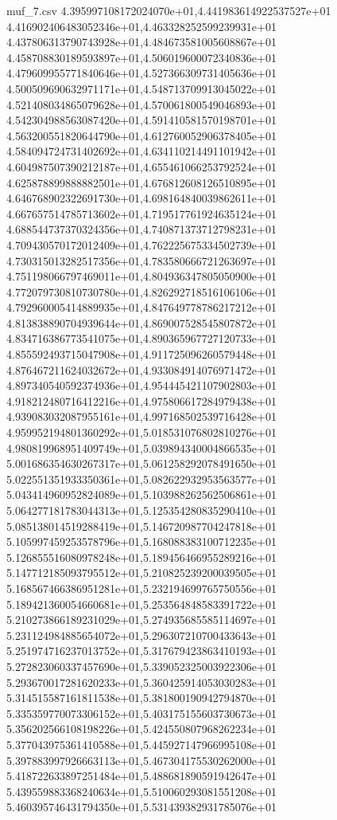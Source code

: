 \begin{filecontents*}{muf_7.csv}
4.395997108172024070e+01,4.441983614922537527e+01
4.416902406483052346e+01,4.463328252599239931e+01
4.437806313790743928e+01,4.484673581005608867e+01
4.458708830189593897e+01,4.506019600072340836e+01
4.479609955771840646e+01,4.527366309731405636e+01
4.500509690632971171e+01,4.548713709913045022e+01
4.521408034865079628e+01,4.570061800549046893e+01
4.542304988563087420e+01,4.591410581570198701e+01
4.563200551820644790e+01,4.612760052906378405e+01
4.584094724731402692e+01,4.634110214491101942e+01
4.604987507390212187e+01,4.655461066253792524e+01
4.625878899888882501e+01,4.676812608126510895e+01
4.646768902322691730e+01,4.698164840039862611e+01
4.667657514785713602e+01,4.719517761924635124e+01
4.688544737370324356e+01,4.740871373712798231e+01
4.709430570172012409e+01,4.762225675334502739e+01
4.730315013282517356e+01,4.783580666721263697e+01
4.751198066797469011e+01,4.804936347805050900e+01
4.772079730810730780e+01,4.826292718516106106e+01
4.792960005414889935e+01,4.847649778786217212e+01
4.813838890704939644e+01,4.869007528545807872e+01
4.834716386773541075e+01,4.890365967727120733e+01
4.855592493715047908e+01,4.911725096260579448e+01
4.876467211624032672e+01,4.933084914076971472e+01
4.897340540592374936e+01,4.954445421107902803e+01
4.918212480716412216e+01,4.975806617284979438e+01
4.939083032087955161e+01,4.997168502539716428e+01
4.959952194801360292e+01,5.018531076802810276e+01
4.980819968951409749e+01,5.039894340004866535e+01
5.001686354630267317e+01,5.061258292078491650e+01
5.022551351933350361e+01,5.082622932953563577e+01
5.043414960952824089e+01,5.103988262562506861e+01
5.064277181783044313e+01,5.125354280835290410e+01
5.085138014519288419e+01,5.146720987704247818e+01
5.105997459253578796e+01,5.168088383100712235e+01
5.126855516080978248e+01,5.189456466955289216e+01
5.147712185093795512e+01,5.210825239200039505e+01
5.168567466386951281e+01,5.232194699765750556e+01
5.189421360054660681e+01,5.253564848583391722e+01
5.210273866189231029e+01,5.274935685585114697e+01
5.231124984885654072e+01,5.296307210700433643e+01
5.251974716237013752e+01,5.317679423863410193e+01
5.272823060337457690e+01,5.339052325003922306e+01
5.293670017281620233e+01,5.360425914053030283e+01
5.314515587161811538e+01,5.381800190942794870e+01
5.335359770073306152e+01,5.403175155603730673e+01
5.356202566108198226e+01,5.424550807968262234e+01
5.377043975361410588e+01,5.445927147966995108e+01
5.397883997926663113e+01,5.467304175530262000e+01
5.418722633897251484e+01,5.488681890591942647e+01
5.439559883368240634e+01,5.510060293081551208e+01
5.460395746431794350e+01,5.531439382931785076e+01

\end{filecontents*}
